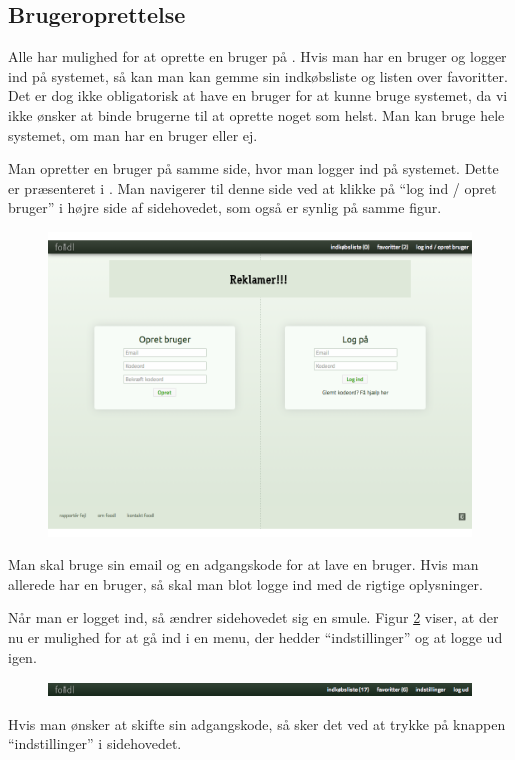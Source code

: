 \subsection{Brugeroprettelse}
\label{subsec:brug-opret}

Alle har mulighed for at oprette en bruger på \Foodl{}. Hvis man har en bruger og logger ind på systemet, så kan man kan gemme sin indkøbsliste og listen over favoritter. Det er dog ikke obligatorisk at have en bruger for at kunne bruge systemet, da vi ikke ønsker at binde brugerne til at oprette noget som helst. Man kan bruge hele systemet, om man har en bruger eller ej.

Man opretter en bruger på samme side, hvor man logger ind på systemet. Dette er præsenteret i . Man navigerer til denne side ved at klikke på ``log ind / opret bruger'' i højre side af sidehovedet, som også er synlig på samme figur.

\begin{figure}[H]
	\centering
	\includegraphics[scale=0.4]{billeder/foodl/thumbnails/opretbrugeroglogind.png}
	\label{fig:overblik-brugeroprettelse}
\end{figure}

Man skal bruge sin email og en adgangskode for at lave en bruger. Hvis man allerede har en bruger, så skal man blot logge ind med de rigtige oplysninger.

Når man er logget ind, så ændrer sidehovedet sig en smule. Figur \ref{fig:foodl-loggetind} viser, at der nu er mulighed for at gå ind i en menu, der hedder ``indstillinger'' og at logge ud igen.

\begin{figure}[H]
	\centering
	\includegraphics[scale=0.4]{billeder/foodl/header-login.png}
	\label{fig:foodl-loggetind}
\end{figure}

Hvis man ønsker at skifte sin adgangskode, så sker det ved at trykke på knappen ``indstillinger'' i sidehovedet.

